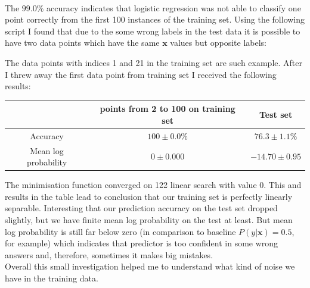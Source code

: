 \documentclass{article}
\newcommand{\vect}[1]{\boldsymbol{#1}} %
\begin{document}
\begin{enumerate}[label=(\alph*)]
						\\
						The $99.0\%$ accuracy indicates that logistic regression was not able to classify one point correctly from the first 100 instances of the training set. 
						Using the following script I found that due to the some wrong labels in the test data it is possible to have two data points which have the same $\vect{x}$ values but opposite labels:
						
						The data points with indices 1 and 21 in the training set are such example. After I threw away the first data point from training set I received the following results:
						\begin{center}
							\begin{tabular}{| c | c | c |}
								\hline
								\, & points from 2 to 100 on training set & Test set \\ 
								\hline
								Accuracy                  & $100 \pm 0.0 \% $ & $ 76.3 \pm 1.1  \%$ \\ 
								\hline
								Mean log probability &$ 0 \pm 0.000$ &  $ -14.70 \pm 0.95  $ \\
								\hline
							\end{tabular}
						\end{center}
						The minimisation function converged on 122 linear search with value 0. This and results in the table lead to conclusion that our training set is perfectly linearly separable. Interesting that our prediction accuracy on the test set dropped slightly, but we have  finite mean log probability on the test at least. But mean log probability is still far below zero (in comparison to baseline $P(y | \vect{x})=0.5$, for example) which indicates that predictor is too confident in some wrong answers and, therefore, sometimes it makes big mistakes. 
						\\
						Overall this small investigation helped me to understand what kind of noise we have in the training data. 
				\end{enumerate}
\end{document}
